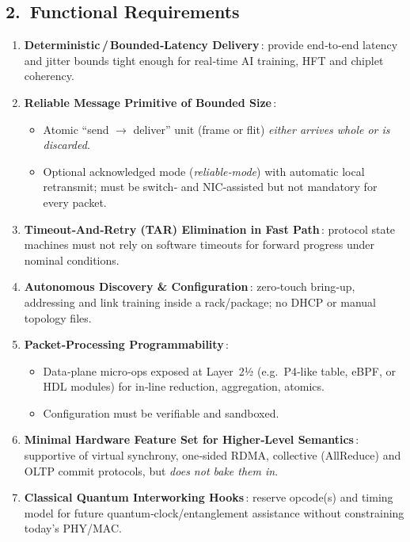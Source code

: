 \documentclass[HFT-main.tex]{subfiles}
\begin{document}
\subsection*{2.\ Functional Requirements}
\begin{enumerate} %
  \item \textbf{Deterministic\,/\,Bounded‑Latency Delivery}\,: provide end‑to‑end latency and jitter bounds tight enough for real‑time AI training, HFT and chiplet coherency.
  \item \textbf{Reliable Message Primitive of Bounded Size}\,:  
        \begin{itemize}
            \item Atomic “send $\rightarrow$ deliver” unit (frame or flit) \emph{either arrives whole or is discarded}.  
            \item Optional acknowledged mode (\textit{reliable‐mode}) with automatic local retransmit; must be switch‑ and NIC‑assisted but not mandatory for every packet.
        \end{itemize}
  \item \textbf{Timeout‐And‐Retry (TAR) Elimination in Fast Path}\,:  
        protocol state machines must not rely on software timeouts for forward progress under nominal conditions.
  \item \textbf{Autonomous Discovery \& Configuration}\,:  
        zero‑touch bring‑up, addressing and link training inside a rack/package; no DHCP or manual topology files.
  \item \textbf{Packet‑Processing Programmability}\,:  
        \begin{itemize}
            \item Data‑plane micro‑ops exposed at Layer 2½ (e.g.\ P4‑like table, eBPF, or HDL modules) for in‑line reduction, aggregation, atomics.  
            \item Configuration must be verifiable and sandboxed.
        \end{itemize}
  \item \textbf{Minimal Hardware Feature Set for Higher‑Level Semantics}\,:  
        supportive of virtual synchrony, one‑sided RDMA, collective (AllReduce) and OLTP commit protocols, but \emph{does not bake them in}.
  \item \textbf{Classical Quantum Interworking Hooks}\,:  
        reserve opcode(s) and timing model for future quantum‑clock/entanglement assistance without constraining today’s PHY/MAC.
\end{enumerate}
\end{document}
